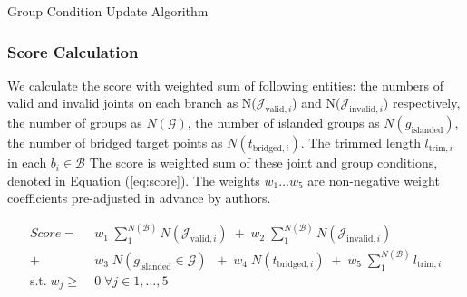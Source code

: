 \begin{algorithm}
  \caption{Group Condition Update Algorithm}
  \begin{algorithmic}[1]

          \EndIf
      \EndFor
      
			\EndFor
		\EndFor
		\EndFor

	\EndIf
	\EndFor
  \EndFunction
  \end{algorithmic}
  \label{al:connection}
\end{algorithm}

\subsubsection{Score Calculation}
We calculate the score with weighted sum of following entities: the numbers of valid and invalid joints on each branch as N($\mathcal{J}_{\text{valid},i}$) and  N($\mathcal{J}_{\text{invalid},i}$) respectively, the number of groups as $N(\mathcal{G} )$, the number of islanded groups as $N(g_{\text{islanded}})$, the number of bridged target points as $N(t_{\text{bridged}, i})$.
The trimmed length $l_{\text{trim}, i}$ in each $b_i \in \mathcal{B}$
The score is weighted sum of these joint and group conditions, denoted in Equation (\ref{eq:score}).
The weights $w_1 \dotso  w_5$ are non-negative weight coefficients pre-adjusted in advance by authors.


\begin{equation} 
 \begin{aligned}
 Score =  &\; w_1\;  \sum_{1}^{N(\mathcal{B})} N(\mathcal{J}_{\text{valid},i})\; +  \;w_2\; \sum_{1}^{N(\mathcal{B})} N(\mathcal{J}_{\text{invalid},i})\\
		+ &\; w_3\;  N(g_{\text{islanded}} \in \mathcal{G} )\;				 	 \;+  \;w_4\;  N(t_{\text{bridged}, i}) \; +  \;w_5\; \sum_{1}^{N(\mathcal{B})} l_{\text{trim}, i}
 \\
   \textrm{s.t.} \; w_j  \geq  &\;0 \; \forall j \in 1, \dotsc , 5 
 \end{aligned}
 \label{eq:score}
\end{equation}

